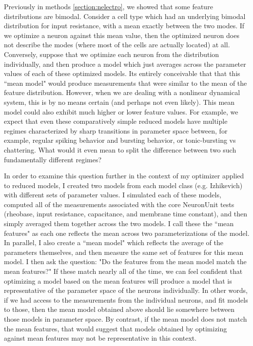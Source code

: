 Previously in methods \ref{section:nelectro}, we showed that some feature distributions are bimodal.
Consider a cell type which had an underlying bimodal distribution for input resistance, with a mean exactly between the two modes.
If we optimize a neuron against this mean value, then the optimized neuron does not describe the modes (where most of the cells are actually located) at all.
Conversely, suppose that we optimize each neuron from the distribution individually, and then produce a model which just averages across the parameter values of each of these optimized models.
Its entirely conceivable that that this ``mean model" would produce measurements that were similar to the mean of the feature distribution.
However, when we are dealing with a nonlinear dynamical system, this is by no means certain (and perhaps not even likely).
This mean model could also exhibit much higher or lower feature values.
For example, we expect that even these comparatively simple reduced models have multiple regimes characterized by sharp transitions in parameter space between, for example, regular spiking behavior and bursting behavior, or tonic-bursting vs chattering.
What would it even mean to split the difference between two such fundamentally different regimes?

In order to examine this question further in the context of my optimizer applied to reduced models, I created two models from each model class (e.g. Izhikevich) with different sets of parameter values.
I simulated each of these models, computed all of the measurements associated with the core NeuronUnit tests (rheobase, input resistance, capacitance, and membrane time constant), and then simply averaged them together across the two models.
I call these the ``mean features" as each one reflects the mean across two parameterizations of the model.
In parallel, I also create a ``mean model" which reflects the average of the parameters themselves, and then measure the same set of features for this mean model.
I then ask the question: "Do the features from the mean model match the mean features?"
If these match nearly all of the time, we can feel confident that optimizing a model based on the mean features will produce a model that is representative of the parameter space of the neurons individually.
In other words, if we had access to the measurements from the individual neurons, and fit models to those, then the mean model obtained above should lie somewhere between those models in parameter space.
By contrast, if the mean model does not match the mean features, that would suggest that models obtained by optimizing against mean features may not be representative in this context.

